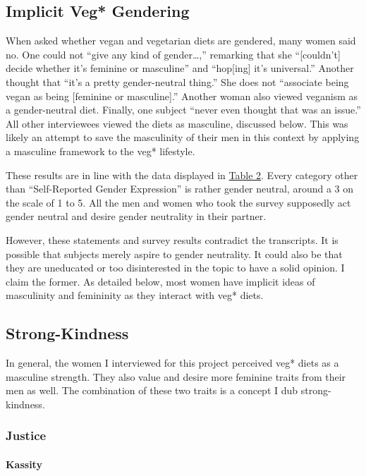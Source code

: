 \documentclass[twoside]{report}
\begin{document}
\begin{multicols*}{2}
\subsection{Implicit Veg* Gendering}

When asked whether vegan and vegetarian diets are gendered, many women
said no. One could not ``give any kind of gender\ldots,'' remarking
that she ``{[}couldn't{]} decide whether it's feminine or masculine''
and ``hop{[}ing{]} it's universal.'' Another thought that ``it's a
pretty gender-neutral thing.'' She does not ``associate being vegan as
being {[}feminine or masculine{]}.'' Another woman also viewed veganism as
a gender-neutral diet. Finally, one subject ``never even thought that
was an issue.'' All other interviewees viewed the diets as masculine,
discussed below. This was likely an attempt to save the masculinity of
their men in this context by applying a masculine framework to the veg* lifestyle.

These results are in line with the data displayed in \hyperlink{table-2}{Table 2}. Every category other than ``Self-Reported Gender Expression'' is rather gender neutral, around a 3 on the scale of 1 to 5. All the men and women who
took the survey supposedly act gender neutral and desire gender
neutrality in their partner.

However, these statements and survey results contradict the transcripts. It is possible that subjects merely aspire to gender neutrality. It could also be that they are uneducated or too disinterested in the topic to have a solid opinion. I claim the former. As detailed below, most women have implicit ideas of masculinity and femininity as they interact with veg* diets.

\subsection{Strong-Kindness}

In general, the women I interviewed for this project perceived veg* diets as a
masculine strength. They also value and desire more feminine traits from
their men as well. The combination of these two traits is a concept I
dub strong-kindness.

\subsubsection{Justice}

\paragraph{Kassity}


\end{multicols*}
\end{document}
